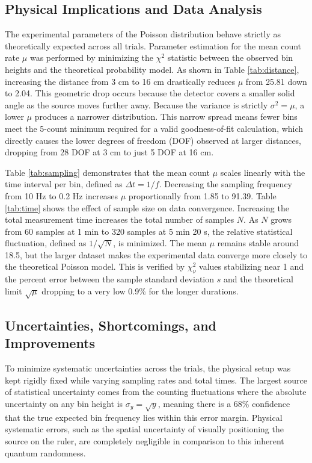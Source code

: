 \documentclass[letterpaper,12pt]{article}
\begin{document}
\subsection{Physical Implications and Data Analysis}
The experimental parameters of the Poisson distribution behave strictly as theoretically expected across all trials. Parameter estimation for the mean count rate $\mu$ was performed by minimizing the $\chi^2$ statistic between the observed bin heights and the theoretical probability model. As shown in Table \ref{tab:distance}, increasing the distance from 3 cm to 16 cm drastically reduces $\mu$ from 25.81 down to 2.04. This geometric drop occurs because the detector covers a smaller solid angle as the source moves further away. Because the variance is strictly $\sigma^2 = \mu$, a lower $\mu$ produces a narrower distribution. This narrow spread means fewer bins meet the 5-count minimum required for a valid goodness-of-fit calculation, which directly causes the lower degrees of freedom (DOF) observed at larger distances, dropping from 28 DOF at 3 cm to just 5 DOF at 16 cm.

Table \ref{tab:sampling} demonstrates that the mean count $\mu$ scales linearly with the time interval per bin, defined as $\Delta t = 1/f$. Decreasing the sampling frequency from 10 Hz to 0.2 Hz increases $\mu$ proportionally from 1.85 to 91.39. Table \ref{tab:time} shows the effect of sample size on data convergence. Increasing the total measurement time increases the total number of samples $N$. As $N$ grows from 60 samples at 1 min to 320 samples at 5 min 20 s, the relative statistical fluctuation, defined as $1/\sqrt{N}$, is minimized. The mean $\mu$ remains stable around 18.5, but the larger dataset makes the experimental data converge more closely to the theoretical Poisson model. This is verified by $\chi^2_\nu$ values stabilizing near 1 and the percent error between the sample standard deviation $s$ and the theoretical limit $\sqrt{\mu}$ dropping to a very low 0.9\% for the longer durations.

\subsection{Uncertainties, Shortcomings, and Improvements}
To minimize systematic uncertainties across the trials, the physical setup was kept rigidly fixed while varying sampling rates and total times. The largest source of statistical uncertainty comes from the counting fluctuations where the absolute uncertainty on any bin height is $\sigma_y = \sqrt{y}$, meaning there is a 68\% confidence that the true expected bin frequency lies within this error margin. Physical systematic errors, such as the spatial uncertainty of visually positioning the source on the ruler, are completely negligible in comparison to this inherent quantum randomness. 
\end{document}
